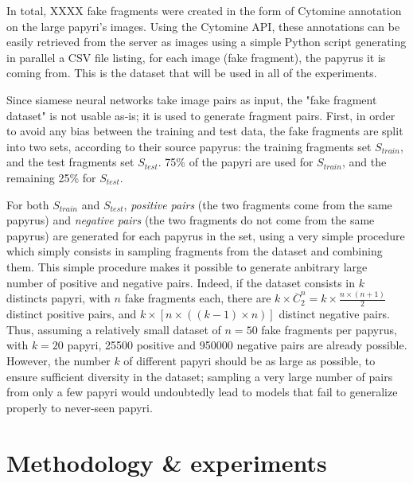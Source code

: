 \documentclass[11pt]{report}
\begin{document}
In total, XXXX fake fragments were created in the form of Cytomine annotation on the large papyri's images. Using the Cytomine API, these annotations can be easily retrieved from the server as images using a simple Python script generating in parallel a CSV file listing, for each image (fake fragment), the papyrus it is coming from. This is the dataset that will be used in all of the experiments.\newline

Since siamese neural networks take image pairs as input, the "fake fragment dataset" is not usable as-is; it is used to generate fragment pairs.\newline
First, in order to avoid any bias between the training and test data, the fake fragments are split into two sets, according to their source papyrus: the training fragments set $S_{train}$, and the test fragments set $S_{test}$. 75\% of the papyri are used for $S_{train}$, and the remaining 25\% for $S_{test}$.\newline

For both $S_{train}$ and $S_{test}$, \emph{positive pairs} (the two fragments come from the same papyrus) and \emph{negative pairs} (the two fragments do not come from the same papyrus) are generated for each papyrus in the set, using a very simple procedure which simply consists in sampling fragments from the dataset and combining them.\newline
This simple procedure makes it possible to generate anbitrary large number of positive and negative pairs. Indeed, if the dataset consists in $k$ distincts papyri, with $n$ fake fragments each, there are $k \times \overline{C}_{2}^{n} = k \times \frac{n \times (n+1)}{2}$ distinct positive pairs, and $k \times [n \times ((k - 1) \times n)]$ distinct negative pairs. Thus, assuming a relatively small dataset of $n = 50$ fake fragments per papyrus, with $k = 20$ papyri, 25500 positive and 950000 negative pairs are already possible.\newline
However, the number $k$ of different papyri should be as large as possible, to ensure sufficient diversity in the dataset; sampling a very large number of pairs from only a few papyri would undoubtedly lead to models that fail to generalize properly to never-seen papyri.\newline


\chapter{Methodology \& experiments}
\end{document}
